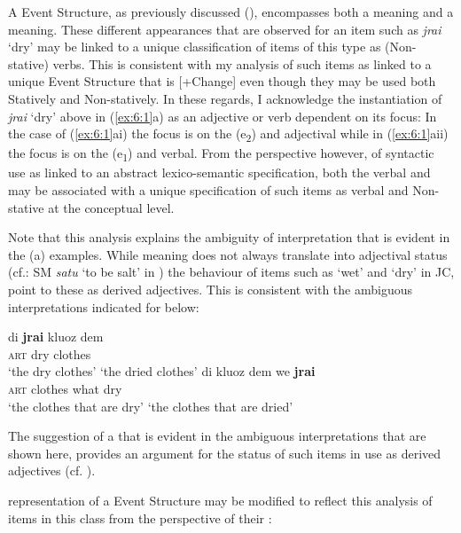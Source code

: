 A  Event Structure, as previously discussed (), encompasses both a  meaning and a  meaning. These different appearances that are observed for an item such as \textit{jrai} `dry' may be linked to a unique classification of items of this type as (Non-stative) verbs. This is consistent with my analysis of such items as linked to a unique Event Structure that is [+Change] even though they may be used both Statively and Non-statively. In these regards, I acknowledge the instantiation of \textit{jrai} `dry' above in (\ref{ex:6:1}a) as an adjective or verb dependent on its focus: In the case of (\ref{ex:6:1}ai) the focus is on the  (e\textsubscript{2}) and adjectival while in (\ref{ex:6:1}aii) the focus is on the  (e\textsubscript{1}) and verbal. From the perspective however, of syntactic use as linked to an abstract lexico-semantic specification, both the verbal and  may be associated with a unique specification of such items as verbal and Non-stative at the conceptual level. 

Note that this analysis explains the ambiguity of interpretation that is evident in the (a) examples. While  meaning does not always translate into adjectival status (cf.: SM \textit{satu} `to be salt' in \citealt{Kouwenberg1996}) the behaviour of items such as `wet' and `dry' in JC, point to these as derived adjectives. This is consistent with the ambiguous interpretations indicated for  below: 

\ea%
\label{ex:6:3}
 \ea
 \gll    di \textbf{jrai} kluoz    dem\\
 \textsc{art}       dry   clothes {\PL}\\
 \ea \glt `the dry clothes' 
 \ex \glt `the dried clothes'
 \z
 \ex
 \gll    di    kluoz    dem we \textbf{jrai}\\
 \textsc{art} clothes {\PL} what        dry \\
 \ea `the clothes that are dry'
 \ex `the clothes that are dried'
 \z
 \z 
\z

The suggestion of a  that is evident in the ambiguous  interpretations that are shown here, provides an argument for the status of such items in  use as derived adjectives (cf. \citealt{Kouwenberg1996}). 

 representation of a  Event Structure may be modified to reflect this analysis of items in this class from the perspective of their : 

